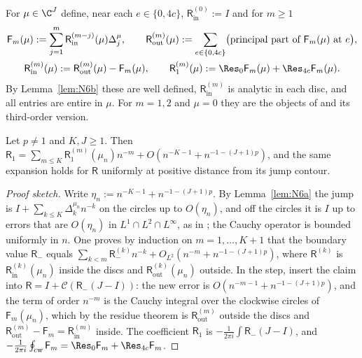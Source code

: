 For $\mu\in\C^J$ define, near each $e\in\{0,4c\}$, $\mathsf R_{\mathrm{in}}^{(0)}:=I$ and for $m\ge1$
\begin{equation}\label{eq:recursion}
\begin{gathered}
  \mathsf F_m(\mu):=\sum_{j=1}^m\mathsf R_{\mathrm{in}}^{(m-j)}(\mu)\Delta_j^\mu,\qquad
  \mathsf R_{\mathrm{out}}^{(m)}(\mu):=\sum_{e\in\{0,4c\}}\bigl(\text{principal part of }\mathsf F_m(\mu)\text{ at }e\bigr),\\
  \mathsf R_{\mathrm{in}}^{(m)}(\mu):=\mathsf R_{\mathrm{out}}^{(m)}(\mu)-\mathsf F_m(\mu),\qquad
  \mathsf R_1^{(m)}(\mu):=\Res_0\mathsf F_m(\mu)+\Res_{4c}\mathsf F_m(\mu).
\end{gathered}
\end{equation}
By Lemma~\ref{lem:N6b} these are well defined, $\mathsf R_{\mathrm{in}}^{(m)}$ is analytic in each disc, and all entries are
entire in $\mu$. For $m=1,2$ and $\mu=0$ they are the objects of \cite[Proposition~9.5]{PaperII} and its third-order
version.

\begin{proposition}\label{prop:N6c}
Let $p\ne1$ and $K,J\ge1$. Then $\mathsf R_1=\sum_{m\le K}\mathsf R_1^{(m)}(\mu_n)n^{-m}+O(n^{-K-1}+n^{-1-(J+1)p})$, and the
same expansion holds for $\mathsf R$ uniformly at positive distance from its jump contour.
\end{proposition}

\begin{proof}[Proof sketch]
Write $\eta_n:=n^{-K-1}+n^{-1-(J+1)p}$. By Lemma~\ref{lem:N6a} the jump is $I+\sum_{k\le K}\Delta_k^{\mu_n}n^{-k}$ on the circles
up to $O(\eta_n)$, and off the circles it is $I$ up to errors that are $O(\eta_n)$ in $L^1\cap L^2\cap L^\infty$, as in
\cite[Propositions~9.5 and~10.8]{PaperII}; the Cauchy operator is bounded uniformly in $n$. One proves by induction on
$m=1,\dots,K+1$ that the boundary value $\mathsf R_-$ equals $\sum_{k<m}\mathsf R_-^{(k)}n^{-k}+O_{L^2}(n^{-m}+n^{-1-(J+1)p})$, where
$\mathsf R^{(k)}$ is $\mathsf R^{(k)}_{\mathrm{in}}(\mu_n)$ inside the discs and $\mathsf R^{(k)}_{\mathrm{out}}(\mu_n)$ outside. In the
step, insert the claim into $\mathsf R=I+\mathcal C(\mathsf R_-(J-I))$: the new error is
$O(n^{-m-1}+n^{-1-(J+1)p})$, and the term of order $n^{-m}$ is the Cauchy integral over the clockwise circles of
$\mathsf F_m(\mu_n)$, which by the residue theorem is $\mathsf R_{\mathrm{out}}^{(m)}$ outside the discs and
$\mathsf R_{\mathrm{out}}^{(m)}-\mathsf F_m=\mathsf R_{\mathrm{in}}^{(m)}$ inside. The coefficient $\mathsf R_1$ is
$-\frac1{2\pi i}\int\mathsf R_-(J-I)$, and $-\frac1{2\pi i}\oint_{\mathrm{cw}}\mathsf F_m=\Res_0\mathsf F_m+\Res_{4c}\mathsf F_m$.
\end{proof}

